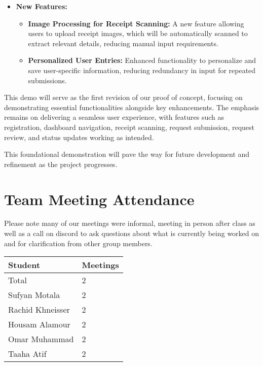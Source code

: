 \documentclass{article}
\begin{document}
\begin{itemize}
    
    \item \textbf{New Features:}
    \begin{itemize}
        \item \textbf{Image Processing for Receipt Scanning:} A new feature allowing users to upload receipt images, which will be automatically scanned to extract relevant details, reducing manual input requirements.
        \item \textbf{Personalized User Entries:} Enhanced functionality to personalize and save user-specific information, reducing redundancy in input for repeated submissions.
    \end{itemize}
\end{itemize}

This demo will serve as the first revision of our proof of concept, focusing on demonstrating essential functionalities alongside key enhancements. The emphasis remains on delivering a seamless user experience, with features such as registration, dashboard navigation, receipt scanning, request submission, request review, and status updates working as intended. 

This foundational demonstration will pave the way for future development and refinement as the project progresses.


\section{Team Meeting Attendance}


Please note many of our meetings were informal, meeting in person after class as well as a call on discord to ask questions about what is currently being worked on and for clarification from other group members.
\begin{table}[H]
    \centering
    \begin{tabular}{ll}
    \toprule
    \textbf{Student} & \textbf{Meetings}\\
    \midrule
    Total & 2\\
    Sufyan Motala & 2\\
    Rachid Khneisser & 2\\
    Housam Alamour & 2\\
    Omar Muhammad & 2\\
    Taaha Atif & 2\\
    \bottomrule
    \end{tabular}
    \end{table}

\end{document}
